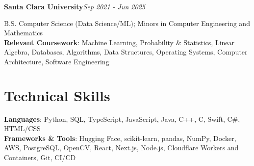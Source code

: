 \documentclass[letterpaper,11pt]{article}
\newcommand{\eduentry}[2]{\textbf{#1}\hfill\textit{#2}\par}
\begin{document}
\eduentry{Santa Clara University}{Sep 2021 - Jun 2025}
B.S. Computer Science (Data Science/ML); Minors in Computer Engineering and Mathematics\\
\textbf{Relevant Coursework}: Machine Learning, Probability \& Statistics, Linear Algebra, Databases, Algorithms, Data Structures, Operating Systems, Computer Architecture, Software Engineering

\section{Technical Skills}

\textbf{Languages}: Python, SQL, TypeScript, JavaScript, Java, C++, C, Swift, C\#, HTML/CSS\\
\textbf{Frameworks \& Tools}: Hugging Face, scikit-learn, pandas, NumPy, Docker, AWS, PostgreSQL, OpenCV, React, Next.js, Node.js, Cloudflare Workers and Containers, Git, CI/CD
\end{document}
